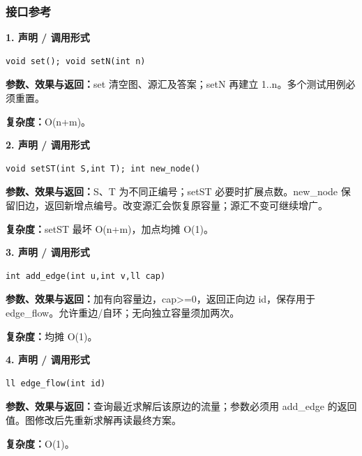 \documentclass[UTF8,a4paper,10pt]{ctexart}
\begin{document}
\subsubsection*{接口参考}
\noindent\begin{minipage}{\textwidth}
\textbf{1. 声明 / 调用形式}
\begin{lstlisting}
void set(); void setN(int n)
\end{lstlisting}
\textbf{参数、效果与返回：}set 清空图、源汇及答案；setN 再建立 1..n。多个测试用例必须重置。

\textbf{复杂度：}O(n+m)。

\end{minipage}\par\vspace{0.4em}
\noindent\begin{minipage}{\textwidth}
\textbf{2. 声明 / 调用形式}
\begin{lstlisting}
void setST(int S,int T); int new_node()
\end{lstlisting}
\textbf{参数、效果与返回：}S、T 为不同正编号；setST 必要时扩展点数。new\_node 保留旧边，返回新增点编号。改变源汇会恢复原容量；源汇不变可继续增广。

\textbf{复杂度：}setST 最坏 O(n+m)，加点均摊 O(1)。

\end{minipage}\par\vspace{0.4em}
\noindent\begin{minipage}{\textwidth}
\textbf{3. 声明 / 调用形式}
\begin{lstlisting}
int add_edge(int u,int v,ll cap)
\end{lstlisting}
\textbf{参数、效果与返回：}加有向容量边，cap>=0，返回正向边 id，保存用于 edge\_flow。允许重边/自环；无向独立容量须加两次。

\textbf{复杂度：}均摊 O(1)。

\end{minipage}\par\vspace{0.4em}
\noindent\begin{minipage}{\textwidth}
\textbf{4. 声明 / 调用形式}
\begin{lstlisting}
ll edge_flow(int id)
\end{lstlisting}
\textbf{参数、效果与返回：}查询最近求解后该原边的流量；参数必须用 add\_edge 的返回值。图修改后先重新求解再读最终方案。

\textbf{复杂度：}O(1)。

\end{minipage}\par\vspace{0.4em}
\end{document}
